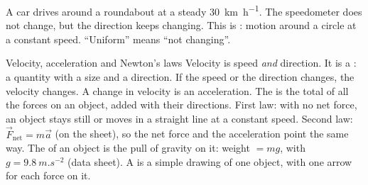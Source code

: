 A car drives around a roundabout at a steady \qty{30}{km.h^{-1}}. The speedometer does not
change, but the direction keeps changing. This is : motion
around a circle at a constant speed. ``Uniform'' means ``not changing''.

\begin{refresher}{Velocity, acceleration and Newton's laws}
Velocity is speed \emph{and} direction. It is a : a quantity with a size and a
direction. If the speed or the direction changes, the velocity changes. A change in velocity
is an acceleration. The  is the total of all the forces on an object, added
with their directions. First law: with no net force, an object stays still or moves in a
straight line at a constant speed. Second law: $\vec{F}_\mathrm{net} = m\vec{a}$ (on the
sheet), so the net force and the acceleration point the same way. The  of an
object is the pull of gravity on it: weight $= mg$, with $g = \qty{9.8}{m.s^{-2}}$ (data
sheet). A  is a simple drawing of one object, with one arrow for each
force on it.
\end{refresher}

